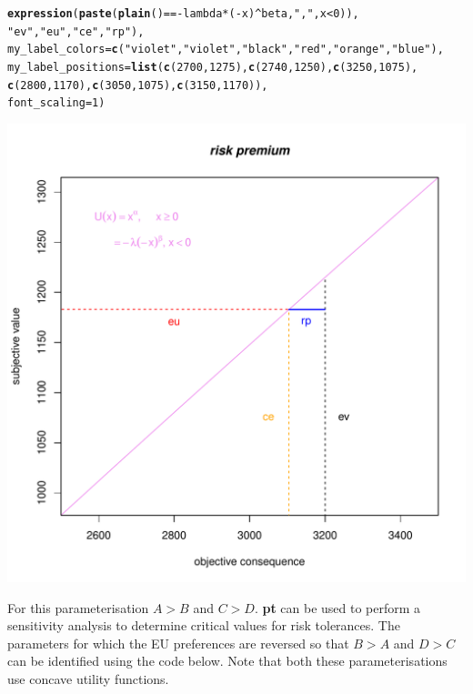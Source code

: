 \documentclass{article}\usepackage[]{graphicx}\usepackage[]{color}
\makeatletter
\newcommand{\hlnum}[1]{\textcolor[rgb]{0.686,0.059,0.569}{#1}}%
\newcommand{\hlstr}[1]{\textcolor[rgb]{0.192,0.494,0.8}{#1}}%
\newcommand{\hlopt}[1]{\textcolor[rgb]{0,0,0}{#1}}%
\newcommand{\hlstd}[1]{\textcolor[rgb]{0.345,0.345,0.345}{#1}}%
\newcommand{\hlkwc}[1]{\textcolor[rgb]{0.333,0.667,0.333}{#1}}%
\newcommand{\hlkwd}[1]{\textcolor[rgb]{0.737,0.353,0.396}{\textbf{#1}}}%
\newenvironment{kframe}{%
 \def\at@end@of@kframe{}%
 \ifinner\ifhmode%
  \def\at@end@of@kframe{\end{minipage}}%
  \begin{minipage}{\columnwidth}%
 \fi\fi%
 \def\FrameCommand##1{\hskip\@totalleftmargin \hskip-\fboxsep
 \colorbox{shadecolor}{##1}\hskip-\fboxsep
     \hskip-\linewidth \hskip-\@totalleftmargin \hskip\columnwidth}%
 \MakeFramed {\advance\hsize-\width
   \@totalleftmargin\z@ \linewidth\hsize
   \@setminipage}}%
 {\par\unskip\endMakeFramed%
 \at@end@of@kframe}
\newenvironment{knitrout}{}{} %
\makeatother
\begin{document}
\begin{knitrout}
\begin{kframe}
\begin{alltt}
                \hlkwd{expression}\hlstd{(}\hlkwd{paste}\hlstd{(}\hlkwd{plain}\hlstd{()}\hlopt{==-}\hlstd{lambda} \hlopt{*} \hlstd{(}\hlopt{-}\hlstd{x)}\hlopt{^}\hlstd{beta,} \hlstr{", "}\hlstd{, x}\hlopt{<}\hlnum{0}\hlstd{)),}
                \hlstr{"ev"}\hlstd{,}\hlstr{"eu"}\hlstd{,}\hlstr{"ce"}\hlstd{,}\hlstr{"rp"}\hlstd{),}
        \hlkwc{my_label_colors}\hlstd{=}\hlkwd{c}\hlstd{(}\hlstr{"violet"}\hlstd{,}\hlstr{"violet"}\hlstd{,}\hlstr{"black"}\hlstd{,}\hlstr{"red"}\hlstd{,}\hlstr{"orange"}\hlstd{,}\hlstr{"blue"}\hlstd{),}
        \hlkwc{my_label_positions}\hlstd{=}\hlkwd{list}\hlstd{(}\hlkwd{c}\hlstd{(}\hlnum{2700}\hlstd{,}\hlnum{1275}\hlstd{),}\hlkwd{c}\hlstd{(}\hlnum{2740}\hlstd{,}\hlnum{1250}\hlstd{),}\hlkwd{c}\hlstd{(}\hlnum{3250}\hlstd{,}\hlnum{1075}\hlstd{),}
                \hlkwd{c}\hlstd{(}\hlnum{2800}\hlstd{,}\hlnum{1170}\hlstd{),}\hlkwd{c}\hlstd{(}\hlnum{3050}\hlstd{,}\hlnum{1075}\hlstd{),}\hlkwd{c}\hlstd{(}\hlnum{3150}\hlstd{,}\hlnum{1170}\hlstd{)),}
        \hlkwc{font_scaling}\hlstd{=}\hlnum{1}\hlstd{)}
\end{alltt}
\end{kframe}

{\centering \includegraphics[width=0.8\linewidth]{figure/unnamed-chunk-14} 

}



\end{knitrout}


For this parameterisation $A > B$ and $C > D$. {\bf pt} can be used to perform a sensitivity analysis to determine
critical values for risk tolerances.
The parameters for which the EU preferences are reversed so that $B > A$ and $D > C$ can be identified using
the code below. Note that both these parameterisations use concave utility functions.
\end{document}
